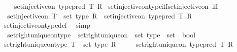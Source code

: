 \begin{isabellebody}
\ \ \ \ set{\isacharunderscore}{\kern0pt}injective{\isacharunderscore}{\kern0pt}on\ {\isacharparenleft}{\kern0pt}type{\isacharunderscore}{\kern0pt}pred\ T{\isacharparenright}{\kern0pt}\ R{\isachardoublequoteclose}\isanewline
{}\isamarkupfalse%
\isanewline
\isanewline
{}\isamarkupfalse%
\ set{\isacharunderscore}{\kern0pt}injective{\isacharunderscore}{\kern0pt}on{\isacharunderscore}{\kern0pt}type{\isacharunderscore}{\kern0pt}iff{\isacharunderscore}{\kern0pt}set{\isacharunderscore}{\kern0pt}injective{\isacharunderscore}{\kern0pt}on\ {\isacharbrackleft}{\kern0pt}iff{\isacharbrackright}{\kern0pt}{\isacharcolon}{\kern0pt}\isanewline
\ \ {\isachardoublequoteopen}set{\isacharunderscore}{\kern0pt}injective{\isacharunderscore}{\kern0pt}on\ {\isacharparenleft}{\kern0pt}T\ {\isacharcolon}{\kern0pt}{\isacharcolon}{\kern0pt}\ set\ type{\isacharparenright}{\kern0pt}\ R\ {\isasymlongleftrightarrow}\ set{\isacharunderscore}{\kern0pt}injective{\isacharunderscore}{\kern0pt}on\ {\isacharparenleft}{\kern0pt}type{\isacharunderscore}{\kern0pt}pred\ T{\isacharparenright}{\kern0pt}\ R{\isachardoublequoteclose}\isanewline
%
\isadelimproof
\ \ %
\endisadelimproof
%
\isatagproof
{}\isamarkupfalse%
\ set{\isacharunderscore}{\kern0pt}injective{\isacharunderscore}{\kern0pt}on{\isacharunderscore}{\kern0pt}type{\isacharunderscore}{\kern0pt}def\ \isamarkupfalse%
\ simp%
\endisatagproof
{\isafoldproof}%
%
\isadelimproof
\isanewline
%
\endisadelimproof
\isanewline
{}\isamarkupfalse%
\isanewline
\ \ set{\isacharunderscore}{\kern0pt}right{\isacharunderscore}{\kern0pt}unique{\isacharunderscore}{\kern0pt}on{\isacharunderscore}{\kern0pt}type\ {\isasymequiv}\ {\isachardoublequoteopen}set{\isacharunderscore}{\kern0pt}right{\isacharunderscore}{\kern0pt}unique{\isacharunderscore}{\kern0pt}on\ {\isacharcolon}{\kern0pt}{\isacharcolon}{\kern0pt}\ set\ type\ {\isasymRightarrow}\ set\ {\isasymRightarrow}\ bool{\isachardoublequoteclose}\isanewline
{}\isanewline
\ \ \isamarkupfalse%
\ {\isachardoublequoteopen}set{\isacharunderscore}{\kern0pt}right{\isacharunderscore}{\kern0pt}unique{\isacharunderscore}{\kern0pt}on{\isacharunderscore}{\kern0pt}type\ {\isacharparenleft}{\kern0pt}T\ {\isacharcolon}{\kern0pt}{\isacharcolon}{\kern0pt}\ set\ type{\isacharparenright}{\kern0pt}\ R\ {\isasymequiv}\isanewline
\ \ \ \ set{\isacharunderscore}{\kern0pt}right{\isacharunderscore}{\kern0pt}unique{\isacharunderscore}{\kern0pt}on\ {\isacharparenleft}{\kern0pt}type{\isacharunderscore}{\kern0pt}pred\ T{\isacharparenright}{\kern0pt}\ R{\isachardoublequoteclose}\isanewline

\end{isabellebody}
